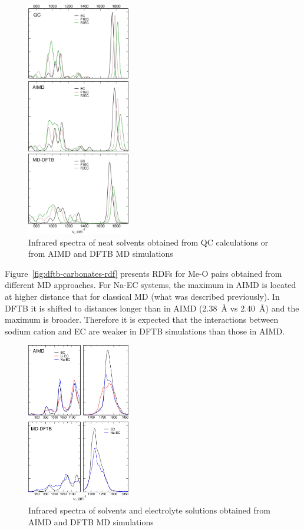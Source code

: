 \begin{figure}[ht]
    \centering
    \includegraphics[width=0.4\textwidth]{img/5-alternatives-to-aimd/1-carbonates/ir-neat-solvents.png}
    \singlespacing
    \caption{Infrared spectra of neat solvents obtained from QC calculations or from AIMD and DFTB MD simulations}
    \label{fig:dftb-carbonates-ir-neat-solvents}
\end{figure}

Figure~\ref{fig:dftb-carbonates-rdf} presents RDFs for Me-O pairs obtained from different MD approaches. For Na-EC systems, the maximum in AIMD is located at higher distance that for classical MD (what was described previously). In DFTB it is shifted to distances longer than in AIMD (2.38~{\AA} vs 2.40~{\AA}) and the maximum is broader. Therefore it is expected that the interactions between sodium cation and EC are weaker in DFTB simulations than those in AIMD.

\begin{figure}[ht]
    \centering
    \includegraphics[width=0.4\textwidth]{img/5-alternatives-to-aimd/1-carbonates/ir-electrolytes.png}
    \caption{Infrared spectra of solvents and electrolyte solutions obtained from AIMD and DFTB MD simulations}
    \label{fig:dftb-carbonates-ir-electrolytes}
\end{figure}

